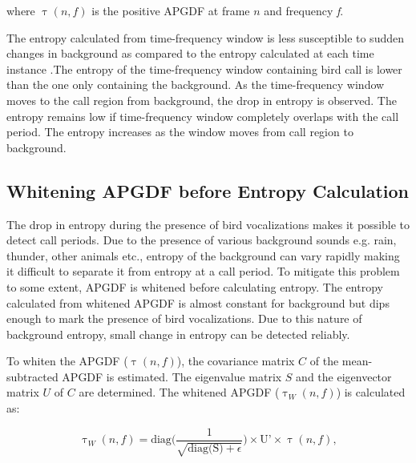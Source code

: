 \documentclass[a4paper]{article}
\begin{document}
where $\uptau(n,f)$ is the positive APGDF at frame $n$ and frequency  \textit{f}.

The entropy calculated from time-frequency window is less susceptible to sudden changes in background as compared to the entropy calculated at each time instance \cite{wang2013}.The entropy of the time-frequency window containing bird call is lower than the one only containing the background. As the time-frequency window moves to the call region from background, the drop in entropy is observed. The entropy remains low if time-frequency window completely overlaps with the call period. The entropy increases as the window moves from call region to background. 




 


\subsection{Whitening APGDF before Entropy Calculation}

The drop in entropy during the presence of bird vocalizations makes it possible to detect call periods. Due to the presence of various background sounds e.g. rain, thunder, other animals etc., entropy of the background can  vary rapidly making it difficult to separate it from entropy  at a call period. To mitigate this problem to some extent, APGDF is whitened  before calculating entropy. The entropy calculated from whitened APGDF  is almost constant for background but dips enough to mark the presence of bird vocalizations. Due to this nature of background entropy, small change in entropy can be detected reliably.

To whiten the APGDF ($\uptau(n,f)$), the covariance matrix $C$ of the mean-subtracted
APGDF is estimated. The eigenvalue matrix $S$ and the eigenvector matrix
$U$ of $C$ are determined. The whitened APGDF
($\uptau_W(n,f)$) is calculated as:

\begin{equation}
\uptau_W(n,f)=\text{diag} \bigg(  \frac{1}{\sqrt{\text{diag(S)}+\epsilon}} \bigg )\times \text{U'} \times \uptau(n,f),
\end{equation}
\end{document}
